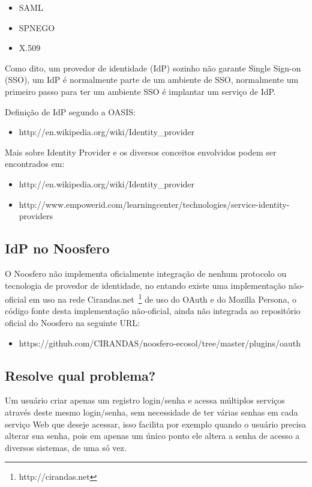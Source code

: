 \documentclass[11pt]{article}
\begin{document}
\begin{itemize}
  \item{SAML}
  \item{SPNEGO}
  \item{X.509}
\end{itemize}

Como dito, um provedor de identidade (IdP) sozinho não garante Single Sign-on (SSO), um
IdP é normalmente parte de um ambiente de SSO, normalmente um primeiro passo
para ter um ambiente SSO é implantar um serviço de IdP.

Definição de IdP segundo a OASIS:

\begin{itemize}
  \item{http://en.wikipedia.org/wiki/Identity\_provider}
\end{itemize}

Mais sobre Identity Provider e os diversos conceitos envolvidos podem ser
encontrados em:
\begin{itemize}
  \item{http://en.wikipedia.org/wiki/Identity\_provider}
  \item{http://www.empowerid.com/learningcenter/technologies/service-identity-providers}
\end{itemize}

\subsection{IdP no Noosfero}

O Noosfero não implementa oficialmente integração de nenhum protocolo ou
tecnologia de provedor de identidade, no entando existe uma implementação
não-oficial em uso na rede Cirandas.net~\footnote{http://cirandas.net} de uso
do OAuth e do Mozilla Persona, o código fonte desta implementação não-oficial,
ainda não integrada ao repositório oficial do Noosfero na seguinte URL:

\begin{itemize}
  \item{https://github.com/CIRANDAS/noosfero-ecosol/tree/master/plugins/oauth}
\end{itemize}

\subsection{Resolve qual problema?}

Um usuário criar apenas um registro login/senha e acessa múltiplos serviços
através deste mesmo login/senha, sem necessidade de ter várias senhas em cada
serviço Web que deseje acessar, isso facilita por exemplo quando o usuário
precisa alterar sua senha, pois em apenas um único ponto ele altera a senha de
acesso a diversos sistemas, de uma só vez.
\end{document}
